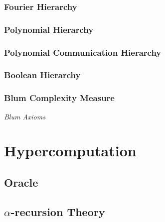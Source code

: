 \subsubsection{Fourier Hierarchy}

\subsubsection{Polynomial Hierarchy}

\subsubsection{Polynomial Communication Hierarchy}

\subsubsection{Boolean Hierarchy}




\subsubsection{Blum Complexity Measure}

\emph{Blum Axioms}



\section{Hypercomputation}\label{sec:hypercomputation}

\subsection{Oracle}\label{sec:oracle}

\subsection{$\alpha$-recursion Theory}\label{sec:alpha_recursion}

